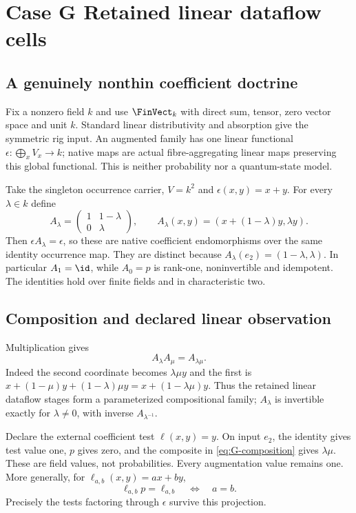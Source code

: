 \section{Case G Retained linear dataflow cells}\label{sec:caseG}

\subsection{A genuinely nonthin coefficient doctrine}
Fix a nonzero field $k$ and use $\FinVect_k$ with direct sum, tensor,
zero vector space and unit $k$. Standard linear distributivity and
absorption give the symmetric rig input. An augmented family has one
linear functional $\epsilon:\bigoplus_xV_x\to k$; native maps are
actual fibre-aggregating linear maps preserving this global functional.
This is neither probability nor a quantum-state model.

Take the singleton occurrence carrier, $V=k^2$ and
$\epsilon(x,y)=x+y$. For every $\lambda\in k$ define
\begin{equation}\label{eq:G-matrix}
A_\lambda=
\begin{pmatrix}1&1-\lambda\\0&\lambda\end{pmatrix},\qquad
A_\lambda(x,y)=(x+(1-\lambda)y,\lambda y).
\end{equation}
Then $\epsilon A_\lambda=\epsilon$, so these are native coefficient
endomorphisms over the same identity occurrence map. They are distinct
because $A_\lambda(e_2)=(1-\lambda,\lambda)$. In particular
$A_1=\id$, while $A_0=p$ is rank-one, noninvertible and idempotent.
The identities hold over finite fields and in characteristic two.

\subsection{Composition and declared linear observation}
Multiplication gives
\begin{equation}\label{eq:G-composition}
A_\lambda A_\mu=A_{\lambda\mu}.
\end{equation}
Indeed the second coordinate becomes $\lambda\mu y$ and the first is
$x+(1-\mu)y+(1-\lambda)\mu y=x+(1-\lambda\mu)y$.
Thus the retained linear dataflow stages form a parameterized
compositional family; $A_\lambda$ is invertible exactly for
$\lambda\ne0$, with inverse $A_{\lambda^{-1}}$.

Declare the external coefficient test $\ell(x,y)=y$. On input $e_2$,
the identity gives test value one, $p$ gives zero, and the composite in
\eqref{eq:G-composition} gives $\lambda\mu$. These are field values,
not probabilities. Every augmentation value remains one. More generally,
for $\ell_{a,b}(x,y)=ax+by$,
\[
\ell_{a,b}p=\ell_{a,b}\quad\Longleftrightarrow\quad a=b.
\]
Precisely the tests factoring through $\epsilon$ survive this projection.


